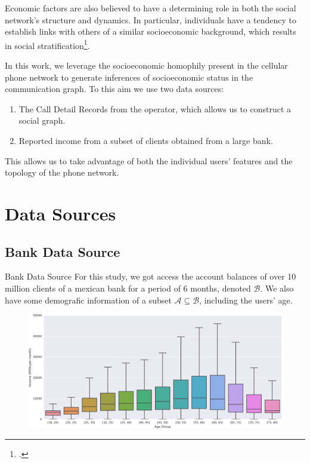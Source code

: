 \documentclass{beamer}
\newcommand{\mathA}{\mathcal{A}}
\newcommand{\mathB}{\mathcal{B}}
\begin{document}
\begin{frame}
Economic factors are also believed to have a determining role in both the social network’s structure and dynamics. In particular, individuals have a tendency to establish links with others of a similar socioeconomic background, which results in social stratification\footcite{leo2015socioeconomic}.

\pause{}

In this work, we leverage the socioeconomic homophily present in the cellular phone network to generate inferences of socioeconomic status in the communication graph. To this aim we use two data sources:
\begin{enumerate}
	\item The Call Detail Records from the operator, which allows us to construct a social graph.
	\item Reported income from a subset of clients obtained from a large bank.
\end{enumerate}

This allows us to take advantage of both the individual users' features and the topology of the phone network.

\end{frame}

\section{Data Sources}
\subsection{Bank Data Source}

\begin{frame}{Bank Data Source}
For this study, we got access the account balances of over 10 million clients of a mexican bank for a period of 6 months, denoted \( \mathB \). We also have some demografic information of a subset \( \mathA \subseteq \mathB \), including the users' age.

\begin{figure}[h]
	\begin{center}
		{\includegraphics[width=\columnwidth]
				{figures/income_age_boxplot4/income_age_boxplot4_wide.png}
		}\label{income_age_boxplot}
	\end{center}
\end{figure}
\end{frame}
\end{document}
